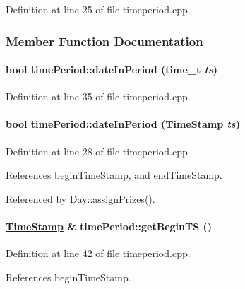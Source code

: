 Definition at line 25 of file timeperiod.cpp.

\subsubsection{Member Function Documentation}
\hypertarget{classtimePeriod_timePerioda7}{
\paragraph[dateInPeriod]{\setlength{\rightskip}{0pt plus 5cm}bool time\-Period::date\-In\-Period (time\_\-t {\em ts})}\hfill}
\label{classtimePeriod_timePerioda7}




Definition at line 35 of file timeperiod.cpp.\hypertarget{classtimePeriod_timePerioda6}{
\paragraph[dateInPeriod]{\setlength{\rightskip}{0pt plus 5cm}bool time\-Period::date\-In\-Period (\hyperlink{classTimeStamp}{Time\-Stamp} {\em ts})}\hfill}
\label{classtimePeriod_timePerioda6}




Definition at line 28 of file timeperiod.cpp.

References begin\-Time\-Stamp, and end\-Time\-Stamp.

Referenced by Day::assign\-Prizes().\hypertarget{classtimePeriod_timePerioda4}{
\paragraph[getBeginTS]{\setlength{\rightskip}{0pt plus 5cm}\hyperlink{classTimeStamp}{Time\-Stamp} \& time\-Period::get\-Begin\-TS ()}\hfill}
\label{classtimePeriod_timePerioda4}




Definition at line 42 of file timeperiod.cpp.

References begin\-Time\-Stamp.

